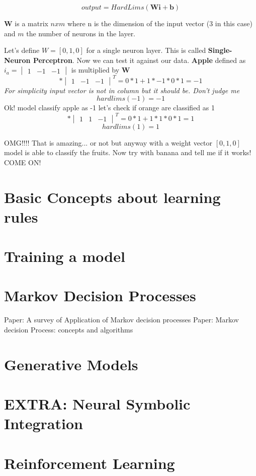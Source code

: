 \documentclass[12pt,a4paper,twoside,openright]{scrbook}
\begin{document}
\begin{equation}
output = HardLims(\textbf{W}\textbf{i} + \textbf{b})
\end{equation}

\textbf{W} is a matrix $nxm$ where n is the dimension of the input vector (3 in this case) and $m$ the number of neurons in the layer.

Let's define $W = [0, 1, 0]$ for a single neuron layer. This is called \textbf{Single-Neuron Perceptron}. Now we can test it against our data.
\newline
\textbf{Apple} defined as  $i_a = \begin{vmatrix}
1 & -1 & -1
\end{vmatrix}$ is multiplied by \textbf{W}
\begin{equation}
[0, 1, 0] * \begin{vmatrix}
1 & -1 & -1
\end{vmatrix}^T = 0*1 + 1*-1 * 0*1 = -1
\end{equation}
\textit{For simplicity input vector is not in column but it should be. Don't judge me}
\begin{equation}
hardlims(-1) = -1
\end{equation}
Ok! model classify apple as -1 let's check if orange are classified as 1
\begin{equation}
[0, 1, 0] * \begin{vmatrix}
1 & 1 & -1
\end{vmatrix}^T = 0*1 + 1*1 * 0*1 = 1
\end{equation}
\begin{equation}
hardlims(1) = 1
\end{equation}

OMG!!!! That is amazing... or not but anyway with a weight vector $[0, 1, 0]$ model is able to classify the fruits. Now try with banana and tell me if it works! COME ON!

\chapter{Basic Concepts about learning rules}


\chapter{Training a model}


\chapter{Markov Decision Processes}
Paper: A survey of Application of Markov decision processes
Paper: Markov decision Process: concepts and algorithms

\chapter{Generative Models}


\chapter{EXTRA: Neural Symbolic Integration}



\chapter{Reinforcement Learning}


 
\end{document}
